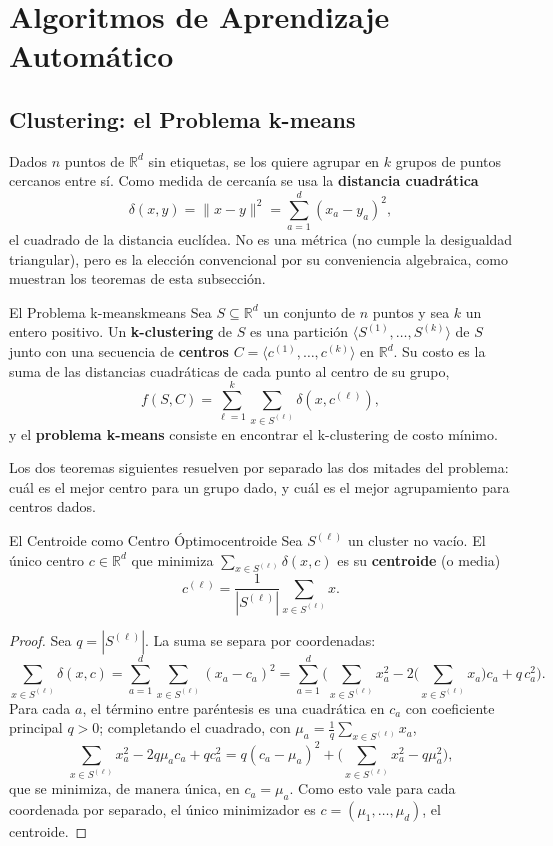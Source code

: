 \documentclass[11pt, a4paper]{article}
\begin{document}
\newpage

\section{Algoritmos de Aprendizaje Automático}

\subsection{Clustering: el Problema k-means}

Dados $n$ puntos de $\mathbb{R}^d$ sin etiquetas, se los quiere agrupar en $k$ grupos de puntos cercanos entre sí. Como medida de cercanía se usa la \textbf{distancia cuadrática}
\[
\delta(x, y) = \|x - y\|^2 = \sum_{a=1}^{d} (x_a - y_a)^2,
\]
el cuadrado de la distancia euclídea. No es una métrica (no cumple la desigualdad triangular), pero es la elección convencional por su conveniencia algebraica, como muestran los teoremas de esta subsección.

\begin{definicion}{El Problema k-means}{kmeans}
Sea $S \subseteq \mathbb{R}^d$ un conjunto de $n$ puntos y sea $k$ un entero positivo. Un \textbf{k-clustering} de $S$ es una partición $\langle S^{(1)}, \dots, S^{(k)} \rangle$ de $S$ junto con una secuencia de \textbf{centros} $C = \langle c^{(1)}, \dots, c^{(k)} \rangle$ en $\mathbb{R}^d$. Su costo es la suma de las distancias cuadráticas de cada punto al centro de su grupo,
\[
f(S, C) = \sum_{\ell=1}^{k} \sum_{x \in S^{(\ell)}} \delta(x, c^{(\ell)}),
\]
y el \textbf{problema k-means} consiste en encontrar el k-clustering de costo mínimo.
\end{definicion}

Los dos teoremas siguientes resuelven por separado las dos mitades del problema: cuál es el mejor centro para un grupo dado, y cuál es el mejor agrupamiento para centros dados.

\begin{teorema}{El Centroide como Centro Óptimo}{centroide}
Sea $S^{(\ell)}$ un cluster no vacío. El único centro $c \in \mathbb{R}^d$ que minimiza $\sum_{x \in S^{(\ell)}} \delta(x, c)$ es su \textbf{centroide} (o media)
\[
c^{(\ell)} = \frac{1}{|S^{(\ell)}|} \sum_{x \in S^{(\ell)}} x.
\]
\end{teorema}

\begin{proof}
Sea $q = |S^{(\ell)}|$. La suma se separa por coordenadas:
\[
\sum_{x \in S^{(\ell)}} \delta(x, c) = \sum_{a=1}^{d} \sum_{x \in S^{(\ell)}} (x_a - c_a)^2
= \sum_{a=1}^{d} \Bigg( \sum_{x \in S^{(\ell)}} x_a^2 - 2 \Big( \sum_{x \in S^{(\ell)}} x_a \Big) c_a + q \, c_a^2 \Bigg).
\]
Para cada $a$, el término entre paréntesis es una cuadrática en $c_a$ con coeficiente principal $q > 0$; completando el cuadrado, con $\mu_a = \frac{1}{q} \sum_{x \in S^{(\ell)}} x_a$,
\[
\sum_{x \in S^{(\ell)}} x_a^2 - 2 q \mu_a c_a + q c_a^2 = q (c_a - \mu_a)^2 + \Big( \sum_{x \in S^{(\ell)}} x_a^2 - q \mu_a^2 \Big),
\]
que se minimiza, de manera única, en $c_a = \mu_a$. Como esto vale para cada coordenada por separado, el único minimizador es $c = (\mu_1, \dots, \mu_d)$, el centroide.
\end{proof}
\end{document}
